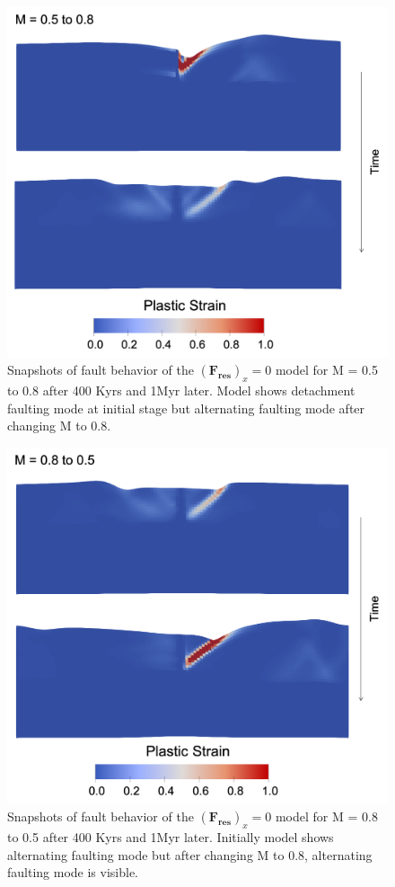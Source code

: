 \documentclass[letterpaper,12pt,notitle]{memphisthesis}                     %
\begin{document}
\begin{figure}[!htb]
	\centering
	\includegraphics[width=0.8\linewidth]{./figs/f0faultm05to08.png}
	\caption{Snapshots of fault behavior of the $(\boldsymbol{F_{res}})_x=0$ model for M = 0.5 to 0.8 after 400 Kyrs and 1Myr later. Model shows detachment faulting mode at initial stage but alternating faulting mode after changing M to 0.8.}
	\label{fig:f0fault05to08}
\end{figure}
\begin{figure}[!htb]
	\centering
	\includegraphics[width=0.8\linewidth]{./figs/f0faultm08to05.png}
	\caption{Snapshots of fault behavior of the $(\boldsymbol{F_{res}})_x=0$ model for M = 0.8 to 0.5 after 400 Kyrs and 1Myr later. Initially model shows alternating faulting mode but after changing M to 0.8, alternating faulting mode is visible.}
	\label{fig:f0fault05to08}
\end{figure}
\end{document}
